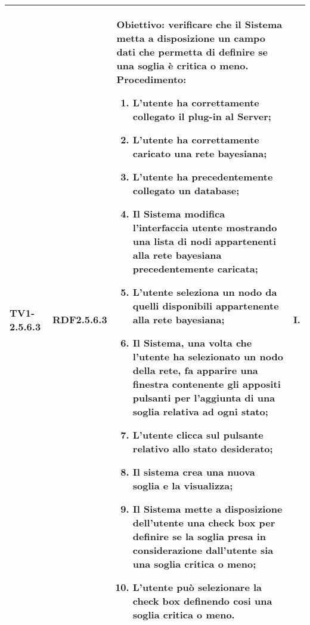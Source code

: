 \begin{longtable}{|C{.15\textwidth}|C{.13\textwidth}|m{.52\textwidth}|C{.08\textwidth}|}
TV1-2.5.6.3 & RDF2.5.6.3  &
	\textbf{Obiettivo}: verificare che il Sistema metta a disposizione un campo dati che permetta di definire se una soglia è critica o meno.  \newline
	\textbf{Procedimento}:
	\begin{enumerate}
		\item L'utente ha correttamente collegato il plug-in al Server;
		\item L'utente ha correttamente caricato una rete bayesiana;
		\item L'utente ha precedentemente collegato un database;
		\item Il Sistema modifica l'interfaccia utente mostrando una lista di nodi appartenenti alla rete bayesiana precedentemente caricata;
		\item L'utente seleziona un nodo da quelli disponibili appartenente alla rete bayesiana;
		\item Il Sistema, una volta che l'utente ha selezionato un nodo della rete, fa apparire una finestra contenente gli appositi pulsanti per l'aggiunta di una soglia relativa ad ogni stato;
		\item L'utente clicca sul pulsante relativo allo stato desiderato;
		\item Il sistema crea una nuova soglia e la visualizza;
		\item Il Sistema mette a disposizione dell'utente una check box per definire se la soglia presa in considerazione dall'utente sia una soglia critica o meno;
		\item L'utente può selezionare la check box definendo cosi una soglia critica o meno.
	\end{enumerate}
	& I. \\
\hline


\end{longtable}
